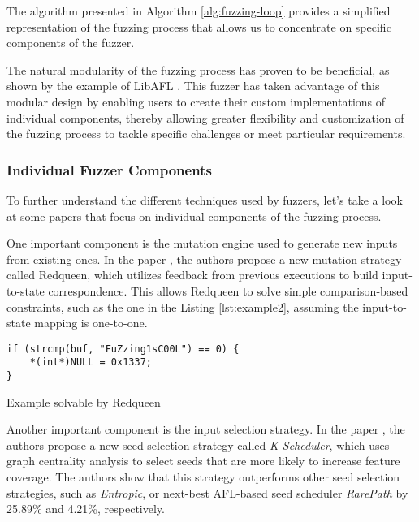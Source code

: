 The algorithm presented in Algorithm \ref{alg:fuzzing-loop} provides a simplified representation of the fuzzing process that allows us to concentrate on specific components of the fuzzer.

The natural modularity of the fuzzing process has proven to be beneficial, as shown by the example of LibAFL \cite{libafl-ccs21}. This fuzzer has taken advantage of this modular design by enabling users to create their custom implementations of individual components, thereby allowing greater flexibility and customization of the fuzzing process to tackle specific challenges or meet particular requirements.

\subsubsection{Individual Fuzzer Components}

To further understand the different techniques used by fuzzers, let's take a look at some papers that focus on individual components of the fuzzing process.

One important component is the mutation engine used to generate new inputs from existing ones. In the paper \cite{redqueen-ndss19}, the authors propose a new mutation strategy called Redqueen, which utilizes feedback from previous executions to build input-to-state correspondence. This allows Redqueen to solve simple comparison-based constraints, such as the one in the Listing \ref{lst:example2}, assuming the input-to-state mapping is one-to-one.

\begin{listing}[htp]
	\centering
	\begin{minipage}{.6\linewidth}
		\begin{verbatim}
if (strcmp(buf, "FuZzing1sC00L") == 0) {
	*(int*)NULL = 0x1337;
}
		\end{verbatim}
	\end{minipage}
	\caption{Example solvable by Redqueen}
	\label{lst:example2}
\end{listing}

Another important component is the input selection strategy. In the paper \cite{effective-seed-scheduling-for-fuzzing-with-graph-centrality-analysis}, the authors propose a new seed selection strategy called \textit{K-Scheduler}, which uses graph centrality analysis to select seeds that are more likely to increase feature coverage. The authors show that this strategy outperforms other seed selection strategies, such as \textit{Entropic}, or next-best AFL-based seed scheduler \textit{RarePath} by 25.89\% and 4.21\%, respectively.

